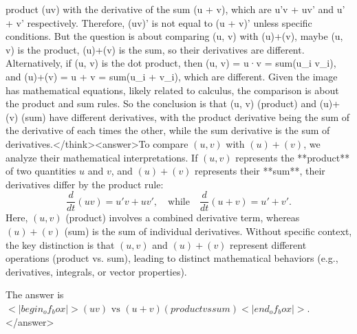 product (uv) with the derivative of the sum (u + v), which are u'v + uv' and u' + v' respectively. Therefore, (uv)' is not equal to (u + v)' unless specific conditions. But the question is about comparing (u, v) with (u)+(v), maybe (u, v) is the product, (u)+(v) is the sum, so their derivatives are different. Alternatively, if (u, v) is the dot product, then (u, v) = u·v = sum(u_i v_i), and (u)+(v) = u + v = sum(u_i + v_i), which are different. Given the image has mathematical equations, likely related to calculus, the comparison is about the product and sum rules. So the conclusion is that (u, v) (product) and (u)+(v) (sum) have different derivatives, with the product derivative being the sum of the derivative of each times the other, while the sum derivative is the sum of derivatives.</think><answer>To compare \((u, v)\) with \((u) + (v)\), we analyze their mathematical interpretations. If \((u, v)\) represents the **product** of two quantities \(u\) and \(v\), and \((u) + (v)\) represents their **sum**, their derivatives differ by the product rule:  
\[
\frac{d}{dt}(uv) = u'v + uv', \quad \text{while} \quad \frac{d}{dt}(u + v) = u' + v'.
\]  
Here, \((u, v)\) (product) involves a combined derivative term, whereas \((u) + (v)\) (sum) is the sum of individual derivatives. Without specific context, the key distinction is that \((u, v)\) and \((u) + (v)\) represent different operations (product vs. sum), leading to distinct mathematical behaviors (e.g., derivatives, integrals, or vector properties).  

The answer is \(<|begin_of_box|>(uv) \text{ vs } (u + v) (product vs sum)<|end_of_box|>\).</answer>